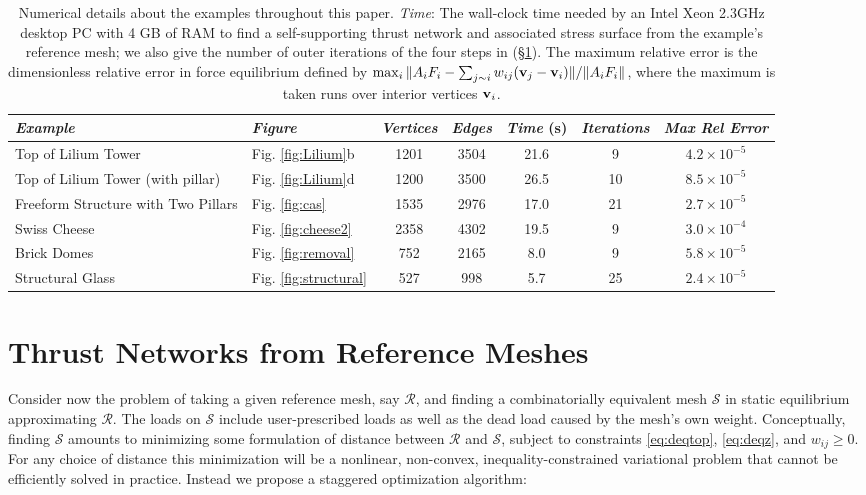 \documentclass[review]{acmsiggraph}
\def\SS{{\mathcal S}}
\def\RR{{\mathcal R}}
\newcommand{\secref}[1]{(\S\ref{#1})}
\begin{document}
\begin{table}[t]
	\bigskip
\begin{tabular}{@{}llccccc@{}}
\hline
	\textit{Example} 
		& \textit{Figure} 
		& \textit{Vertices}  
		& \textit{Edges} 
			& \textit{Time} (s) 
			& \textit{Iterations} 
			& \textit{Max Rel Error} \\
	\hline
		Top of Lilium Tower 
		& Fig. \ref{fig:Lilium}b
		& 1201 
		& 3504 
			& 21.6 
			& 9 
			& $4.2 \times 10^{-5}$
	\\ Top of Lilium Tower (with pillar) 
		& Fig. \ref{fig:Lilium}d
		& 1200 
		& 3500 
			& 26.5 
			& 10 
			& $8.5 \times 10^{-5}$
	\\ Freeform Structure with Two Pillars 
		& Fig. \ref{fig:cas} 
		& 1535 
		& 2976 
			& 17.0 
			& 21 
			& $2.7\times 10^{-5}$
	\\ Swiss Cheese 
		& Fig. \ref{fig:cheese2} 
		& 2358 
		& 4302 
			& 19.5 
			& 9 
			& $3.0 \times 10^{-4}$
	\\ Brick Domes 
		& Fig. \ref{fig:removal} 
		& 752 
		& 2165 
			& 8.0 
			& 9 
			& $5.8 \times 10^{-5}$
	\\ Structural Glass 
		& Fig. \ref{fig:structural} 
		& 527 
		& 998 
			& 5.7 
			& 25 
			& $2.4\times 10^{-5}$
	\\ \hline
  \end{tabular}
	\medskip
	\caption{Numerical details about the examples throughout this 
paper. \emph{Time}: The wall-clock time needed by an Intel Xeon 2.3GHz 
desktop PC with 4 GB of RAM to find a self-supporting thrust network and 
associated stress surface from the example's reference mesh; we also give 
the number of outer iterations of the four steps in \secref{sec:opt}. The 
maximum relative error is the dimensionless relative error in force 
equilibrium defined by $\max_i \| A_i F_i - \sum\nolimits_{j\sim i} w_{ij} 
({\mathbf v}_j-{\mathbf v}_i) \|/\|A_i F_i\|$, where the maximum is taken
runs over interior vertices ${\mathbf v}_i$. 
} \label{table:data}


\end{table}


\section{Thrust Networks from Reference Meshes} \label{sec:opt} 

Consider now the problem of taking a given reference mesh, say $\RR$, and 
finding a combinatorially equivalent mesh $\SS$ in static equilibrium 
approximating $\RR$. The loads on $\SS$ include user-prescribed loads as 
well as the dead load caused by the mesh's own weight. Conceptually, 
finding $\SS$ amounts to minimizing some formulation of distance between 
$\RR$ and $\SS$, subject to constraints \eqref{eq:deqtop}, 
\eqref{eq:deqz}, and $w_{ij} \geq 0$. For any choice of distance this 
minimization will be a nonlinear, non-convex, inequality-constrained 
variational problem that cannot be efficiently solved in practice. Instead 
we propose a staggered optimization algorithm:
\end{document}
